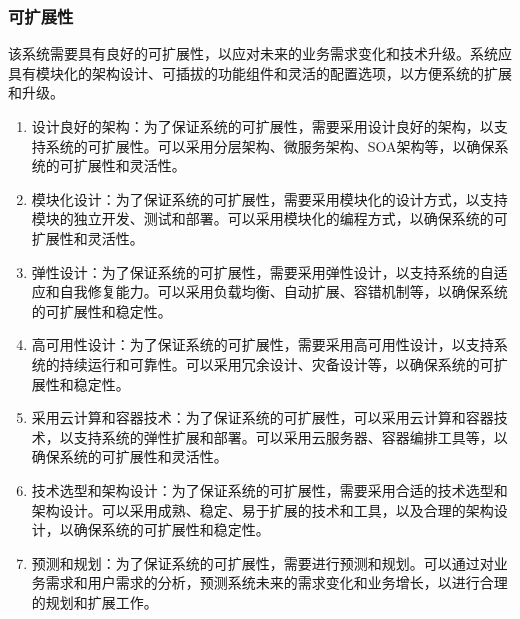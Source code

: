 \documentclass[UTF8]{ctexart}
\newcommand{\m}[1]{\textcolor{modify}{#1}}
\begin{document}
    \subsubsection{可扩展性}
    该系统需要具有良好的可扩展性，以应对未来的业务需求变化和技术升级。系统应具有模块化的架构设计、可插拔的功能组件和灵活的配置选项，以方便系统的扩展和升级。
    \m{
        \begin{enumerate}
            \item 设计良好的架构：为了保证系统的可扩展性，需要采用设计良好的架构，以支持系统的可扩展性。可以采用分层架构、微服务架构、SOA架构等，以确保系统的可扩展性和灵活性。
            \item 模块化设计：为了保证系统的可扩展性，需要采用模块化的设计方式，以支持模块的独立开发、测试和部署。可以采用模块化的编程方式，以确保系统的可扩展性和灵活性。
            \item 弹性设计：为了保证系统的可扩展性，需要采用弹性设计，以支持系统的自适应和自我修复能力。可以采用负载均衡、自动扩展、容错机制等，以确保系统的可扩展性和稳定性。
            \item 高可用性设计：为了保证系统的可扩展性，需要采用高可用性设计，以支持系统的持续运行和可靠性。可以采用冗余设计、灾备设计等，以确保系统的可扩展性和稳定性。
            \item 采用云计算和容器技术：为了保证系统的可扩展性，可以采用云计算和容器技术，以支持系统的弹性扩展和部署。可以采用云服务器、容器编排工具等，以确保系统的可扩展性和灵活性。
            \item 技术选型和架构设计：为了保证系统的可扩展性，需要采用合适的技术选型和架构设计。可以采用成熟、稳定、易于扩展的技术和工具，以及合理的架构设计，以确保系统的可扩展性和稳定性。
            \item 预测和规划：为了保证系统的可扩展性，需要进行预测和规划。可以通过对业务需求和用户需求的分析，预测系统未来的需求变化和业务增长，以进行合理的规划和扩展工作。
        \end{enumerate}
    }
\end{document}

